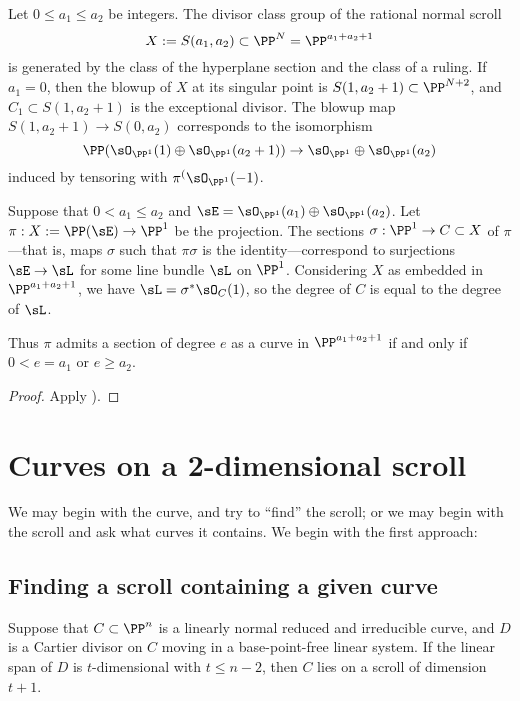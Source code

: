\begin{corollary}\cite[****]{Hartshorne1977}
Let $0\leq a_1\leq a_2$ be integers. The divisor class group of the 
rational normal scroll 
$$
X:=S(a_1,a_2) \subset \PP^N = \PP^{a_1+a_2+1}
$$
is generated by the class of the hyperplane section and the class
of a ruling. If $a_1 = 0$, then the blowup of $X$ at its singular point is $S(1, a_2+1)\subset \PP^{N+2}$,
and $C_1\subset S(1, a_2+1)$ is the exceptional divisor. The blowup map $S(1, a_2+1) \to S(0,a_2)$
corresponds to the isomorphism 
$$
\PP(\sO_{\PP^1}(1) \oplus \sO_{\PP^1}(a_2+1)) \to \sO_{\PP^1} \oplus \sO_{\PP^1}(a_2)
$$
induced by tensoring with $\pi^(\sO_{\PP^1}(-1)$.
\end{corollary}

\begin{proposition} Suppose that $0<a_1\leq a_2$ and
$\sE = \sO_{\PP^1}(a_1)\oplus \sO_{\PP^1}(a_2)$. Let $\pi: X:= \PP(\sE) \to \PP^1$ be the projection.
The sections $\sigma:\PP^1 \to C\subset X$ of $\pi$---that is, maps $\sigma$ such that $\pi\sigma$ is the 
identity---correspond to surjections
$\sE \to \sL$ for some line bundle $\sL$ on $\PP^1$. Considering  $X$ as embedded in 
$\PP^{a_1+a_2+1}$, we have $\sL = \sigma^*\sO_C(1)$, so the degree of $C$ is equal
to the degree of $\sL$.

Thus $\pi$ admits a section of degree $e$ as a curve in $\PP^{a_1+a_2+1}$ if and only if
$0<e = a_1$ or $e\geq a_2$.
\end{proposition}

\begin{proof}
Apply \cite[II.7.12]{Hartshorne1977}).
\end{proof}

\section{Curves on a 2-dimensional scroll}\label{curves on scrolls}

We may begin with the curve, and try to ``find'' the scroll; or we may begin with the scroll and ask
what curves it contains. We begin with the first approach:


\subsection{Finding a scroll containing a given curve}

\begin{proposition}
Suppose that $C\subset \PP^n$ is a linearly normal reduced and irreducible curve, and $D$ is a  Cartier divisor on $C$ moving in a base-point-free linear system. If the linear span of $D$ is $t$-dimensional with $t\leq n-2$, then $C$ lies on a scroll of dimension $t+1$.
\end{proposition}

